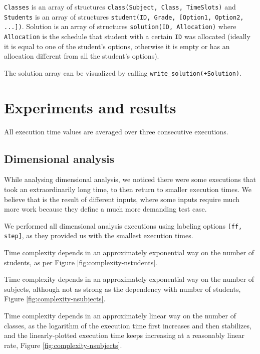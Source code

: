 \documentclass[runningheads]{llncs}
\begin{document}
\texttt{Classes} is an array of structures \texttt{class(Subject, Class, TimeSlots)} and \texttt{Students} is an array of structures \texttt{student(ID, Grade, [Option1, Option2, ...])}. Solution is an array of structures \texttt{solution(ID, Allocation)} where \texttt{Allocation} is the schedule that student with a certain \texttt{ID} was allocated (ideally it is equal to one of the student's options, otherwise it is empty or has an allocation different from all the student's options).

The solution array can be visualized by calling \texttt{write\_solution(+Solution)}.

\section{Experiments and results}

All execution time values are averaged over three consecutive executions.

\subsection{Dimensional analysis}

While analysing dimensional analysis, we noticed there were some executions that took an extraordinarily long time, to then return to smaller execution times. We believe that is the result of different inputs, where some inputs require much more work because they define a much more demanding test case.

We performed all dimensional analysis executions using labeling options \texttt{[ff, step]}, as they provided us with the smallest execution times.

Time complexity depends in an approximately exponential way on the number of students, as per Figure \ref{fig:complexity-nstudents}.

Time complexity depends in an approximately exponential way on the number of subjects, although not as strong as the dependency with number of students, Figure \ref{fig:complexity-nsubjects}.

Time complexity depends in an approximately linear way on the number of classes, as the logarithm of the execution time first increases and then stabilizes, and the linearly-plotted execution time keeps increasing at a reasonably linear rate, Figure \ref{fig:complexity-nsubjects}.
\end{document}
